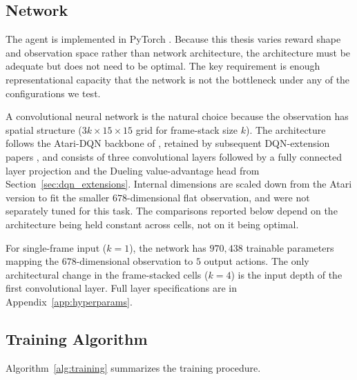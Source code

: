 \documentclass[12pt,a4paper,titlepage]{article}
\begin{document}
\subsection{Network}
\label{sec:network}

The agent is implemented in PyTorch \citep{Paszke2019}. Because this thesis varies reward shape and observation space rather than network architecture, the architecture must be adequate but does not need to be optimal. The key requirement is enough representational capacity that the network is not the bottleneck under any of the configurations we test.

A convolutional neural network is the natural choice because the observation has spatial structure ($3k \times 15 \times 15$ grid for frame-stack size $k$). The architecture follows the Atari-DQN backbone of \citet{Mnih2015}, retained by subsequent DQN-extension papers \citep{Wang2016, Hessel2018}, and consists of three convolutional layers followed by a fully connected layer projection and the Dueling value-advantage head from Section~\ref{sec:dqn_extensions}. Internal dimensions are scaled down from the Atari version to fit the smaller $678$-dimensional flat observation, and were not separately tuned for this task. The comparisons reported below depend on the architecture being held constant across cells, not on it being optimal.

For single-frame input ($k=1$), the network has $970{,}438$ trainable parameters mapping the $678$-dimensional observation to $5$ output actions. The only architectural change in the frame-stacked cells ($k=4$) is the input depth of the first convolutional layer. Full layer specifications are in Appendix~\ref{app:hyperparams}.

\subsection{Training Algorithm}
\label{sec:training_algorithm}

Algorithm~\ref{alg:training} summarizes the training procedure.
\end{document}

